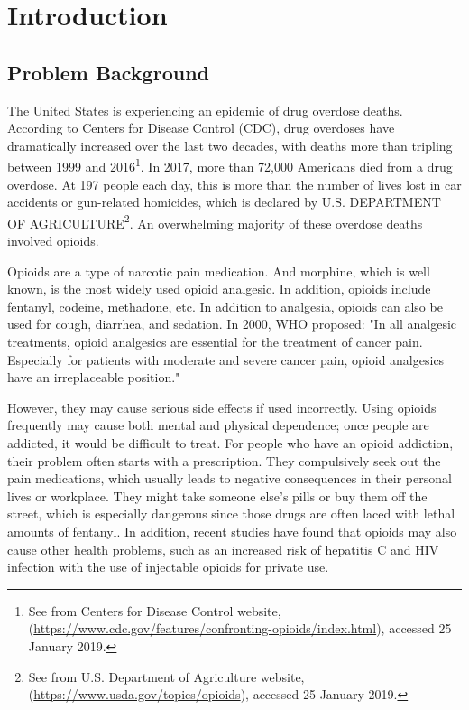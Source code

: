 \section{Introduction}
\subsection{Problem Background}
The United States is experiencing an epidemic of drug overdose deaths. According to Centers for Disease Control (CDC), drug overdoses have dramatically increased over the last two decades, with deaths more than tripling between 1999 and 2016\footnote{See from Centers for Disease Control website, (\url{https://www.cdc.gov/features/confronting-opioids/index.html}), accessed 25 January 2019.}. In 2017, more than 72,000 Americans died from a drug overdose. At 197 people each day, this is more than the number of lives lost in car accidents or gun-related homicides, which is declared by U.S. DEPARTMENT OF AGRICULTURE\footnote{See from U.S. Department of Agriculture website, (\url{https://www.usda.gov/topics/opioids}), accessed 25 January 2019.}. An overwhelming majority of these overdose deaths involved opioids.

Opioids are a type of narcotic pain medication. And morphine, which is well known, is the most widely used opioid analgesic. In addition, opioids include fentanyl, codeine, methadone, etc. In addition to analgesia, opioids can also be used for cough, diarrhea, and sedation. In 2000, WHO proposed: "In all analgesic treatments, opioid analgesics are essential for the treatment of cancer pain. Especially for patients with moderate and severe cancer pain, opioid analgesics have an irreplaceable position."

However, they may cause serious side effects if used incorrectly. Using opioids frequently may cause both mental and physical dependence; once people are addicted, it would be difficult to treat. For people who have an opioid addiction, their problem often starts with a prescription. They compulsively seek out the pain medications, which usually leads to negative consequences in their personal lives or workplace. They might take someone else’s pills or buy them off the street, which is especially dangerous since those drugs are often laced with lethal amounts of fentanyl. In addition, recent studies have found that opioids may also cause other health problems, such as an increased risk of hepatitis C and HIV infection with the use of injectable opioids for private use. 

